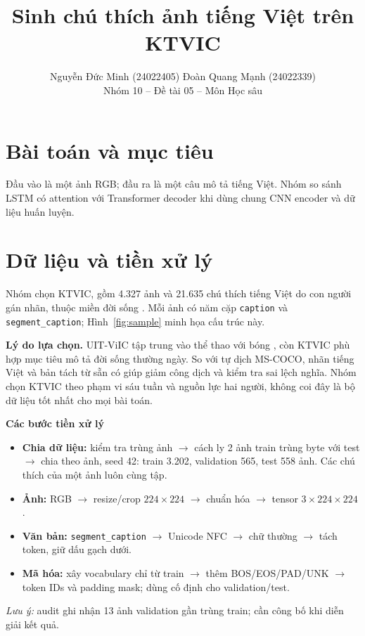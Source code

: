 \documentclass[11pt]{article}
\title{Sinh chú thích ảnh tiếng Việt trên KTVIC}
\author{Nguyễn Đức Minh (24022405) \quad Đoàn Quang Mạnh (24022339)\\Nhóm 10 -- Đề tài 05 -- Môn Học sâu}
\begin{document}
\maketitle
\section{Bài toán và mục tiêu}
Đầu vào là một ảnh RGB; đầu ra là một câu mô tả tiếng Việt. Nhóm so sánh LSTM có attention với Transformer decoder khi dùng chung CNN encoder và dữ liệu huấn luyện.


\section{Dữ liệu và tiền xử lý}
Nhóm chọn KTVIC, gồm 4.327 ảnh và 21.635 chú thích tiếng Việt do con người gán nhãn, thuộc miền đời sống \citep{pham2024ktvic}. Mỗi ảnh có năm cặp \texttt{caption} và \texttt{segment\_caption}; Hình~\ref{fig:sample} minh họa cấu trúc này.



\textbf{Lý do lựa chọn.} UIT-ViIC tập trung vào thể thao với bóng \citep{lam2020uitviic}, còn KTVIC phù hợp mục tiêu mô tả đời sống thường ngày. So với tự dịch MS-COCO, nhãn tiếng Việt và bản tách từ sẵn có giúp giảm công dịch và kiểm tra sai lệch nghĩa. Nhóm chọn KTVIC theo phạm vi sáu tuần và nguồn lực hai người, không coi đây là bộ dữ liệu tốt nhất cho mọi bài toán.

\textbf{Các bước tiền xử lý}
\begin{itemize}
\item \textbf{Chia dữ liệu:} kiểm tra trùng ảnh $\rightarrow$ cách ly 2 ảnh train trùng byte với test $\rightarrow$ chia theo ảnh, seed 42: train 3.202, validation 565, test 558 ảnh. Các chú thích của một ảnh luôn cùng tập.
\item \textbf{Ảnh:} RGB $\rightarrow$ resize/crop $224\times224$ $\rightarrow$ chuẩn hóa $\rightarrow$ tensor $3\times224\times224$.
\item \textbf{Văn bản:} \texttt{segment\_caption} $\rightarrow$ Unicode NFC $\rightarrow$ chữ thường $\rightarrow$ tách token, giữ dấu gạch dưới.
\item \textbf{Mã hóa:} xây vocabulary chỉ từ train $\rightarrow$ thêm BOS/EOS/PAD/UNK $\rightarrow$ token IDs và padding mask; dùng cố định cho validation/test.
\end{itemize}
\textit{Lưu ý:} audit ghi nhận 13 ảnh validation gần trùng train; cần công bố khi diễn giải kết quả.
\end{document}
